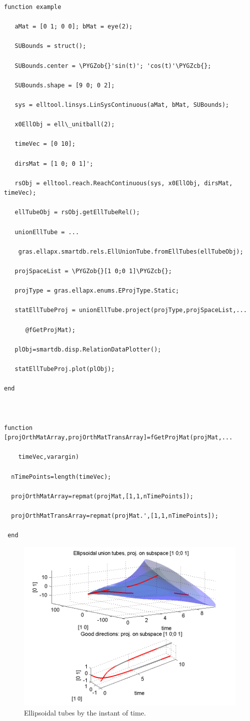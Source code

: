 \documentclass[letterpaper,10pt,english]{sphinxmanual}
\def\PYGZob{\char`\{}
\def\PYGZcb{\char`\}}
\begin{document}
\begin{Verbatim}[commandchars=\\\{\}]
function example

   aMat = [0 1; 0 0]; bMat = eye(2);  

   SUBounds = struct();

   SUBounds.center = \PYGZob{}'sin(t)'; 'cos(t)'\PYGZcb{};  

   SUBounds.shape = [9 0; 0 2]; 

   sys = elltool.linsys.LinSysContinuous(aMat, bMat, SUBounds);

   x0EllObj = ell\_unitball(2);

   timeVec = [0 10]; 

   dirsMat = [1 0; 0 1]';  

   rsObj = elltool.reach.ReachContinuous(sys, x0EllObj, dirsMat, timeVec);

   ellTubeObj = rsObj.getEllTubeRel();

   unionEllTube = ...

    gras.ellapx.smartdb.rels.EllUnionTube.fromEllTubes(ellTubeObj);

   projSpaceList = \PYGZob{}[1 0;0 1]\PYGZcb{};

   projType = gras.ellapx.enums.EProjType.Static;

   statEllTubeProj = unionEllTube.project(projType,projSpaceList,...

      @fGetProjMat);

   plObj=smartdb.disp.RelationDataPlotter();

   statEllTubeProj.plot(plObj);

end



function [projOrthMatArray,projOrthMatTransArray]=fGetProjMat(projMat,...

    timeVec,varargin)

  nTimePoints=length(timeVec);

  projOrthMatArray=repmat(projMat,[1,1,nTimePoints]);

  projOrthMatTransArray=repmat(projMat.',[1,1,nTimePoints]);

 end
\end{Verbatim}
\begin{figure}[htbp]
\centering
\capstart

\includegraphics[width=0.700\linewidth]{chapter05_section03_unionTubeStatProj.png}
\caption{Ellipsoidal tubes by the instant of time.}\label{chap_implement:uniontubestatproj}\end{figure}
\end{document}
